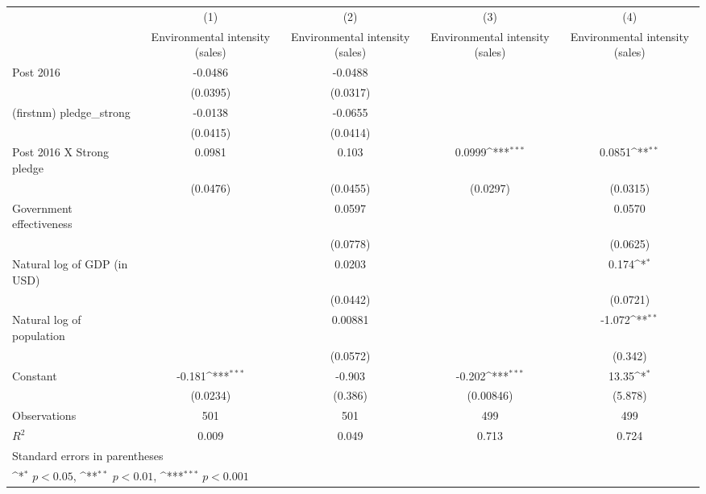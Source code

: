 {
\def\sym#1{\ifmmode^{#1}\else\(^{#1}\)\fi}
\begin{tabular}{l*{4}{c}}
\hline\hline
                    &\multicolumn{1}{c}{(1)}&\multicolumn{1}{c}{(2)}&\multicolumn{1}{c}{(3)}&\multicolumn{1}{c}{(4)}\\
                    &\multicolumn{1}{c}{Environmental intensity (sales)}&\multicolumn{1}{c}{Environmental intensity (sales)}&\multicolumn{1}{c}{Environmental intensity (sales)}&\multicolumn{1}{c}{Environmental intensity (sales)}\\
\hline
Post 2016           &     -0.0486         &     -0.0488         &                     &                     \\
                    &    (0.0395)         &    (0.0317)         &                     &                     \\
[1em]
(firstnm) pledge\_strong&     -0.0138         &     -0.0655         &                     &                     \\
                    &    (0.0415)         &    (0.0414)         &                     &                     \\
[1em]
Post 2016 X Strong pledge&      0.0981         &       0.103         &      0.0999\sym{***}&      0.0851\sym{**} \\
                    &    (0.0476)         &    (0.0455)         &    (0.0297)         &    (0.0315)         \\
[1em]
Government effectiveness&                     &      0.0597         &                     &      0.0570         \\
                    &                     &    (0.0778)         &                     &    (0.0625)         \\
[1em]
Natural log of GDP (in USD)&                     &      0.0203         &                     &       0.174\sym{*}  \\
                    &                     &    (0.0442)         &                     &    (0.0721)         \\
[1em]
Natural log of population&                     &     0.00881         &                     &      -1.072\sym{**} \\
                    &                     &    (0.0572)         &                     &     (0.342)         \\
[1em]
Constant            &      -0.181\sym{***}&      -0.903         &      -0.202\sym{***}&       13.35\sym{*}  \\
                    &    (0.0234)         &     (0.386)         &   (0.00846)         &     (5.878)         \\
\hline
Observations        &         501         &         501         &         499         &         499         \\
\(R^{2}\)           &       0.009         &       0.049         &       0.713         &       0.724         \\
\hline\hline
\multicolumn{5}{l}{\footnotesize Standard errors in parentheses}\\
\multicolumn{5}{l}{\footnotesize \sym{*} \(p<0.05\), \sym{**} \(p<0.01\), \sym{***} \(p<0.001\)}\\
\end{tabular}
}
